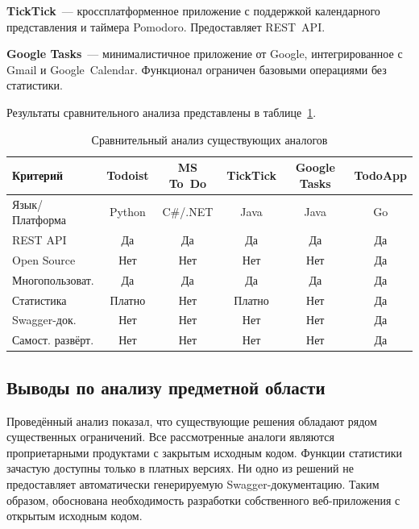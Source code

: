 \documentclass[a4paper,14pt]{extarticle}
\begin{document}
\textbf{TickTick}~--- кроссплатформенное приложение с поддержкой календарного представления и таймера Pomodoro. Предоставляет REST~API.

\textbf{Google Tasks}~--- минималистичное приложение от Google, интегрированное с Gmail и Google~Calendar. Функционал ограничен базовыми операциями без статистики.

Результаты сравнительного анализа представлены в таблице~\ref{tab:analogs}.

\begin{table}[H]
\caption{Сравнительный анализ существующих аналогов}\label{tab:analogs}
\centering
\small
\begin{tabularx}{\textwidth}{|X|c|c|c|c|c|}
\hline
\textbf{Критерий} & \textbf{Todoist} & \textbf{MS To~Do} & \textbf{TickTick} & \textbf{Google Tasks} & \textbf{TodoApp} \\
\hline
Язык/Платформа & Python & C\#/.NET & Java & Java & Go \\
\hline
REST API & Да & Да & Да & Да & Да \\
\hline
Open Source & Нет & Нет & Нет & Нет & Да \\
\hline
Многопользоват. & Да & Да & Да & Да & Да \\
\hline
Статистика & Платно & Нет & Платно & Нет & Да \\
\hline
Swagger-док. & Нет & Нет & Нет & Нет & Да \\
\hline
Самост. развёрт. & Нет & Нет & Нет & Нет & Да \\
\hline
\end{tabularx}
\end{table}

\subsection{Выводы по анализу предметной области}

Проведённый анализ показал, что существующие решения обладают рядом существенных ограничений. Все рассмотренные аналоги являются проприетарными продуктами с закрытым исходным кодом. Функции статистики зачастую доступны только в платных версиях. Ни одно из решений не предоставляет автоматически генерируемую Swagger-документацию. Таким образом, обоснована необходимость разработки собственного веб-приложения с открытым исходным кодом.

\clearpage
\end{document}
